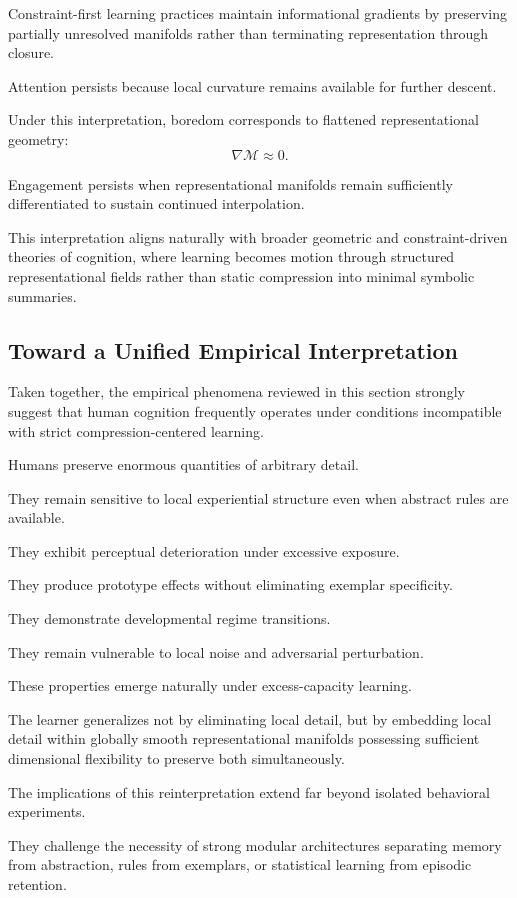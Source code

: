 \documentclass[12pt,a4paper]{article}
\begin{document}
Constraint-first learning practices maintain informational gradients by preserving partially unresolved manifolds rather than terminating representation through closure.

Attention persists because local curvature remains available for further descent.

Under this interpretation, boredom corresponds to flattened representational geometry:
\[
\nabla \mathcal{M}
\approx 0.
\]

Engagement persists when representational manifolds remain sufficiently differentiated to sustain continued interpolation.

This interpretation aligns naturally with broader geometric and constraint-driven theories of cognition, where learning becomes motion through structured representational fields rather than static compression into minimal symbolic summaries.

\subsection{Toward a Unified Empirical Interpretation}

Taken together, the empirical phenomena reviewed in this section strongly suggest that human cognition frequently operates under conditions incompatible with strict compression-centered learning.

Humans preserve enormous quantities of arbitrary detail.

They remain sensitive to local experiential structure even when abstract rules are available.

They exhibit perceptual deterioration under excessive exposure.

They produce prototype effects without eliminating exemplar specificity.

They demonstrate developmental regime transitions.

They remain vulnerable to local noise and adversarial perturbation.

These properties emerge naturally under excess-capacity learning.

The learner generalizes not by eliminating local detail, but by embedding local detail within globally smooth representational manifolds possessing sufficient dimensional flexibility to preserve both simultaneously.

The implications of this reinterpretation extend far beyond isolated behavioral experiments.

They challenge the necessity of strong modular architectures separating memory from abstraction, rules from exemplars, or statistical learning from episodic retention.
\end{document}
